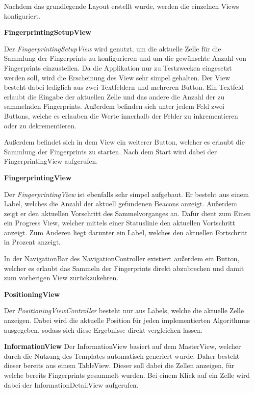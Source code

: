 Nachdem das grundlegende Layout erstellt wurde, werden die einzelnen Views konfiguriert.

\textbf{FingerprintingSetupView}


Der \emph{FingerprintingSetupView} wird genutzt, um die aktuelle Zelle für die Sammlung der Fingerprints zu konfigurieren und um die gewünschte Anzahl von Fingerprints einzustellen. Da die Applikation nur zu Testzwecken eingesetzt werden soll, wird die Erscheinung des View sehr simpel gehalten. 
Der View besteht dabei lediglich aus zwei Textfeldern und mehreren Button. 
Ein Textfeld erlaubt die Eingabe der aktuellen Zelle und das andere die Anzahl der zu sammelnden Fingerprints.
Außerdem befinden sich unter jedem Feld zwei Buttons, welche es erlauben die Werte innerhalb der Felder zu inkrementieren oder zu dekrementieren.

Außerdem befindet sich in dem View ein weiterer Button, welcher es erlaubt die Sammlung der Fingerprints zu starten. 
Nach dem Start wird dabei der FingerprintingView aufgerufen.


\textbf{FingerprintingView}

Der \emph{FingerprintingView} ist ebenfalls sehr simpel aufgebaut.
Er besteht aus einem Label, welches die Anzahl der aktuell gefundenen Beacons anzeigt.
Außerdem zeigt er den aktuellen Vorschritt des Sammelvorganges an. Dafür dient zum Einen ein Progress View, welcher mittels einer Statuslinie den aktuellen Vortschritt anzeigt. Zum Anderen liegt darunter ein Label, welches den aktuellen Fortschritt in Prozent anzeigt.

In der NavigationBar des NavigationController existiert außerdem ein Button, welcher es erlaubt das Sammeln der Fingerprints direkt abzubrechen und damit zum vorherigen View zurückzukehren.


\textbf{PositioningView}

Der \emph{PositioningViewController} besteht nur aus Labels, welche die aktuelle Zelle anzeigen. Dabei wird die aktuelle Position für jeden implementierten Algorithmus ausgegeben, sodass sich diese Ergebnisse direkt vergleichen lassen. 


\textbf{InformationView} 
Der InformationView basiert auf dem MasterView, welcher durch die Nutzung des Templates automatisch generiert wurde. Daher besteht dieser bereits aus einem TableView.
Dieser soll dabei die Zellen anzeigen, für welche bereits Fingerprints gesammelt wurden. Bei einem Klick auf ein Zelle wird dabei der InformationDetailView aufgerufen.

